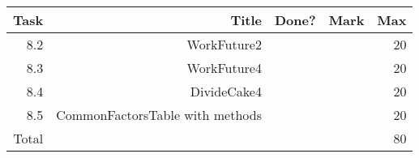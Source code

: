 \\ \\ \\ \noindent\parbox[l]{\textwidth}{
 \\ \\
\begin{tabular}{||r|r|r|r|r||} \hline \hline
Task  & Title                            & Done? & Mark & Max \\ \hline
8.2 & WorkFuture2 & & & 20 \\ \hline
8.3 & WorkFuture4 & & & 20 \\ \hline
8.4 & DivideCake4 & & & 20 \\ \hline
8.5 & CommonFactorsTable with methods & & & 20 \\ \hline
\hline
Total &                                  &       &      & 80 \\ \hline
\hline
\end{tabular} \\ \\
}
